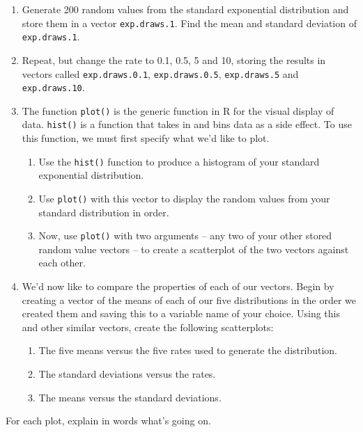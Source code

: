 \documentclass[
]{article}
\providecommand{\tightlist}{%
  \setlength{\itemsep}{0pt}\setlength{\parskip}{0pt}}
\begin{document}
\begin{enumerate}
\def\labelenumi{\arabic{enumi}.}
\item
  Generate 200 random values from the standard exponential distribution
  and store them in a vector \texttt{exp.draws.1}. Find the mean and
  standard deviation of \texttt{exp.draws.1}.
\item
  Repeat, but change the rate to 0.1, 0.5, 5 and 10, storing the results
  in vectors called \texttt{exp.draws.0.1}, \texttt{exp.draws.0.5},
  \texttt{exp.draws.5} and \texttt{exp.draws.10}.
\item
  The function \texttt{plot()} is the generic function in R for the
  visual display of data. \texttt{hist()} is a function that takes in
  and bins data as a side effect. To use this function, we must first
  specify what we'd like to plot.

  \begin{enumerate}
  \def\labelenumii{\alph{enumii}.}
  \tightlist
  \item
    Use the \texttt{hist()} function to produce a histogram of your
    standard exponential distribution.
  \item
    Use \texttt{plot()} with this vector to display the random values
    from your standard distribution in order.
  \item
    Now, use \texttt{plot()} with two arguments -- any two of your other
    stored random value vectors -- to create a scatterplot of the two
    vectors against each other.
  \end{enumerate}
\item
  We'd now like to compare the properties of each of our vectors. Begin
  by creating a vector of the means of each of our five distributions in
  the order we created them and saving this to a variable name of your
  choice. Using this and other similar vectors, create the following
  scatterplots:

  \begin{enumerate}
  \def\labelenumii{\alph{enumii}.}
  \tightlist
  \item
    The five means versus the five rates used to generate the
    distribution.
  \item
    The standard deviations versus the rates.
  \item
    The means versus the standard deviations.
  \end{enumerate}
\end{enumerate}

For each plot, explain in words what's going on.
\end{document}
